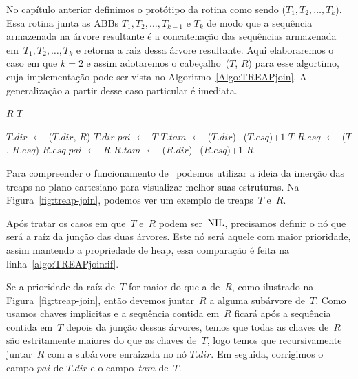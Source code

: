 No capítulo anterior definimos o protótipo da rotina \treapJoin{} como sendo \treapJoin($T_1, T_2, \ldots, T_k$).
Essa rotina junta as ABBs $T_1, T_2, \ldots, T_{k-1}$ e $T_k$ de modo que a sequência armazenada na árvore resultante é a concatenação das sequências armazenada em~$T_1, T_2, \ldots, T_k$ e retorna a raiz dessa árvore resultante.
Aqui elaboraremos o caso em que $k=2$ e assim adotaremos o cabeçalho~\treapJoin($T$, $R$) para esse algortimo, cuja implementação pode ser vista no Algoritmo~\ref{Algo:TREAPjoin}.
A generalização a partir desse caso particular é imediata.

\begin{algorithm}
\caption{\treapJoin($T$, $R$)}
\label{Algo:TREAPjoin}
\begin{algorithmic}[1]
 \Return $R$
\EndIf
{} \Return $T$
\EndIf

\label{algo:TREAPjoin:if}
  \State $T$.$dir$ $\gets$ \treapJoin($T$.$dir$, $R$)
  \State $T$.$dir$.$pai$ $\gets$ $T$
  \State $T$.$tam$ $\gets$ \treapGetSize($T$.$dir$)+\treapGetSize($T$.$esq$)+$1$
  \State \Return $T$
\Else 
  \State $R$.$esq$ $\gets$ \treapJoin($T$, $R$.$esq$)
  \State $R$.$esq$.$pai$ $\gets$ $R$
  \State $R$.$tam$ $\gets$ \treapGetSize($R$.$dir$)+\treapGetSize($R$.$esq$)+$1$
  \State \Return $R$
\EndIf
\end{algorithmic}
\end{algorithm}


Para compreender o funcionamento de~\treapJoin{} podemos utilizar a ideia da imerção das treaps no plano cartesiano para visualizar melhor suas estruturas.
Na Figura~\ref{fig:treap-join}, podemos ver um exemplo de treaps~$T$ e~$R$.


Após tratar os casos em que~$T$ e~$R$ podem ser~$\text{NIL}$, precisamos definir o nó que será a raíz da junção das duas árvores.
Este nó será aquele com maior prioridade, assim mantendo a propriedade de heap, essa comparação é feita na linha~\ref{algo:TREAPjoin:if}.

Se a prioridade da raíz de~$T$ for maior do que a de~$R$, como ilustrado na Figura~\ref{fig:treap-join}, então devemos juntar~$R$ a alguma subárvore de~$T$.
Como usamos chaves implicitas e a sequência contida em~$R$ ficará após a sequência contida em~$T$ depois da junção dessas árvores,
temos que todas as chaves de~$R$ são estritamente maiores do que as chaves de~$T$, logo temos que recursivamente juntar~$R$ com a subárvore enraizada no nó $T$.$dir$.
Em seguida, corrigimos o campo $pai$ de $T$.$dir$ e o campo~$tam$ de~$T$.


